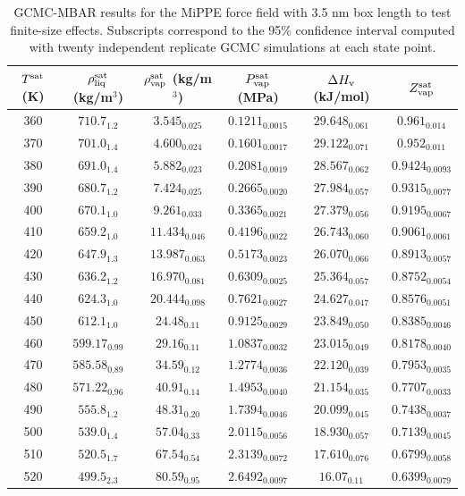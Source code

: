 \documentclass[journal=jctc,manuscript=article]{achemso}
\begin{document}
	\begin{table}[htb!]
		\caption{GCMC-MBAR results for the MiPPE force field with 3.5 nm box length to test finite-size effects. Subscripts correspond to the 95\% confidence interval computed with twenty independent replicate GCMC simulations at each state point.}
		\begin{center}
			\begin{tabular}{|c|c|c|c|c|c|}
				\hline
				$T^{\rm sat}$ (K) & $\rho_{\rm liq}^{\rm sat}$ (kg/m$^3$) & $\rho_{\rm vap}^{\rm sat}$ (kg/m$^3$) & $P_{\rm vap}^{\rm sat}$ (MPa) & $\Delta H_{\rm v}$ (kJ/mol) & $Z_{\rm vap}^{\rm sat}$ \\ \hline
				360 & $710.7_{1.2}$ & $3.545_{0.025}$ & $0.1211_{0.0015}$ & $29.648_{0.061}$ & $0.961_{0.014}$ \\
				370 & $701.0_{1.4}$ & $4.600_{0.024}$ & $0.1601_{0.0017}$ & $29.122_{0.071}$ & $0.952_{0.011}$ \\
				380 & $691.0_{1.4}$ & $5.882_{0.023}$ & $0.2081_{0.0019}$ & $28.567_{0.062}$ & $0.9424_{0.0093}$ \\
				390 & $680.7_{1.2}$ & $7.424_{0.025}$ & $0.2665_{0.0020}$ & $27.984_{0.057}$ & $0.9315_{0.0077}$ \\
				400 & $670.1_{1.0}$ & $9.261_{0.033}$ & $0.3365_{0.0021}$ & $27.379_{0.056}$ & $0.9195_{0.0067}$ \\
				410 & $659.2_{1.0}$ & $11.434_{0.046}$ & $0.4196_{0.0022}$ & $26.743_{0.060}$ & $0.9061_{0.0061}$ \\
				420 & $647.9_{1.3}$ & $13.987_{0.063}$ & $0.5173_{0.0023}$ & $26.070_{0.066}$ & $0.8913_{0.0057}$ \\
				430 & $636.2_{1.2}$ & $16.970_{0.081}$ & $0.6309_{0.0025}$ & $25.364_{0.057}$ & $0.8752_{0.0054}$ \\
				440 & $624.3_{1.0}$ & $20.444_{0.098}$ & $0.7621_{0.0027}$ & $24.627_{0.047}$ & $0.8576_{0.0051}$ \\
				450 & $612.1_{1.0}$ & $24.48_{0.11}$ & $0.9125_{0.0029}$ & $23.849_{0.050}$ & $0.8385_{0.0046}$ \\
				460 & $599.17_{0.99}$ & $29.16_{0.11}$ & $1.0837_{0.0032}$ & $23.015_{0.049}$ & $0.8178_{0.0040}$ \\
				470 & $585.58_{0.89}$ & $34.59_{0.12}$ & $1.2774_{0.0036}$ & $22.120_{0.039}$ & $0.7953_{0.0035}$ \\
				480 & $571.22_{0.96}$ & $40.91_{0.14}$ & $1.4953_{0.0040}$ & $21.154_{0.035}$ & $0.7707_{0.0033}$ \\
				490 & $555.8_{1.2}$ & $48.31_{0.20}$ & $1.7394_{0.0046}$ & $20.099_{0.045}$ & $0.7438_{0.0037}$ \\
				500 & $539.0_{1.4}$ & $57.04_{0.33}$ & $2.0115_{0.0056}$ & $18.930_{0.057}$ & $0.7139_{0.0045}$ \\
				510 & $520.5_{1.7}$ & $67.54_{0.54}$ & $2.3139_{0.0072}$ & $17.610_{0.076}$ & $0.6799_{0.0058}$ \\
				520 & $499.5_{2.3}$ & $80.59_{0.95}$ & $2.6492_{0.0097}$ & $16.07_{0.11}$ & $0.6399_{0.0079}$ \\
				\hline
			\end{tabular}
		\end{center}
	\end{table}
\end{document}
